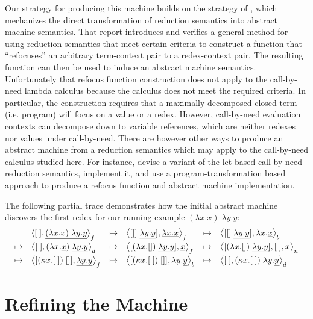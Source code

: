 \documentclass{LMCS}
\theoremstyle{plain}
\theoremstyle{remark}
\newcommand{\refocus}[1]{\Braket{#1}_f}
\newcommand{\rebuild}[1]{\Braket{#1}_b}
\newcommand{\reduce}[1]{\Braket{#1}_d}
\newcommand{\need}[1]{\Braket{#1}_n}
\begin{document}
Our strategy for producing this machine builds on the strategy of
\citet{danvyTRrefocusing}, which mechanizes the direct transformation of
reduction semantics into abstract machine semantics.  That report introduces
and verifies a general method for using reduction semantics that meet certain
criteria to construct a function that ``refocuses'' an arbitrary term-context
pair to a redex-context pair. The resulting function can then be used to induce
an abstract machine semantics.  Unfortunately that refocus function
construction does not apply to the call-by-need lambda calculus because
the calculus does not meet the required criteria.  In particular, the
construction requires that a maximally-decomposed closed term (i.e. program)
will focus on a value or a redex.  However, call-by-need evaluation contexts
can decompose down to variable references, which are neither redexes nor values
under call-by-need.
There are however other ways to produce an abstract machine from a reduction
semantics which may apply to the call-by-need calculus studied here.  For
instance, \citet{danvy10need} devise a variant of the let-based call-by-need
reduction semantics, implement it, and use a program-transformation based
approach to produce a refocus function and abstract machine implementation.


The following partial trace demonstrates how the initial abstract machine
discovers the first redex for our running example $(\lambda x.x)\;\lambda y.y$:
\begin{displaymath}
\begin{array}{llllll}
& \braket{[\;], \underline{(\lambda x.x)\;\lambda y.y}}_f & \mapsto &
\refocus{[[]\;\underline{\lambda y.y}], \underline{\lambda x.x}} & \mapsto &
\rebuild{[[]\;\underline{\lambda y.y}], \lambda x.\underline{x}} \\[1.0ex]
 \mapsto &
\reduce{[\;], (\lambda x.\underline{x})\;\underline{\lambda y.y}} & \mapsto &
\refocus{[(\lambda x.[])\;\underline{\lambda y.y}], \underline{x}} & \mapsto &
\need{[(\lambda x.[])\;\underline{\lambda y.y}],[\;], x} \\[1.0ex]
 \mapsto & 
\refocus{[(\kappa x.[\;])\;[]], \underline{\lambda y.y}} & \mapsto &
\rebuild{[(\kappa x.[\;])\;[]], \lambda y.\underline{y}} & \mapsto & 
\reduce{[\;], (\kappa x.[\;])\;\lambda y.\underline{y}} 
\end{array}
\end{displaymath}


\section{Refining the Machine}
\end{document}
